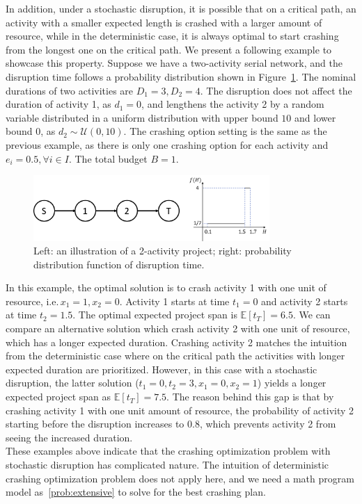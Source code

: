 \documentclass[11pt]{article}
\newcommand{\noi}{\noindent}
\begin{document}
	In addition, under a stochastic disruption, it is possible that on a critical path, an activity with a smaller expected length is crashed with a larger amount of resource, while in the deterministic case, it is always optimal to start crashing from the longest one on the critical path. We present a following example to showcase this property. Suppose we have a two-activity serial network, and the disruption time follows a probability distribution shown in Figure~\ref{fig:2act}. The nominal durations of two activities are \(D_1 = 3, D_2 = 4\). The disruption does not affect the duration of activity 1, as \(d_1 = 0\), and lengthens the activity 2 by a random variable distributed in a uniform distribution with upper bound \(10\) and lower bound \(0\), as \(d_2 \sim \mathcal{U}(0,10)\). The crashing option setting is the same as the previous example, as there is only one crashing option for each activity and \(e_i = 0.5, \forall i \in I\). The total budget \(B = 1\).
		\begin{figure}[H]
			\centering
			\includegraphics[width=0.8\textwidth]{2act}
			\caption{Left: an illustration of a 2-activity project; right: probability distribution function of disruption time.}
			\label{fig:2act}
		\end{figure}
	\noi In this example, the optimal solution is to crash activity 1 with one unit of resource, i.e.\,\(x_1 = 1, x_2 = 0\). Activity 1 starts at time \(t_1 = 0\) and activity 2 starts at time \(t_2 = 1.5\). The optimal expected project span is \(\mathbb{E}[t_T] = 6.5\). We can compare an alternative solution which crash activity 2 with one unit of resource, which has a longer expected duration. Crashing activity 2 matches the intuition from the deterministic case where on the critical path the activities with longer expected duration are prioritized. However, in this case with a stochastic disruption, the latter solution (\(t_1 = 0, t_2 = 3, x_1 = 0, x_2 = 1\)) yields a longer expected project span as \(\mathbb{E}[t_T] = 7.5\). The reason behind this gap is that by crashing activity 1 with one unit amount of resource, the probability of activity 2 starting before the disruption increases to \(0.8\), which prevents activity 2 from seeing the increased duration. \\
	\newline
	These examples above indicate that the crashing optimization problem with stochastic disruption has complicated nature. The intuition of deterministic crashing optimization problem does not apply here, and we need a math program model as~\eqref{prob:extensive} to solve for the best crashing plan.
	
\end{document}
